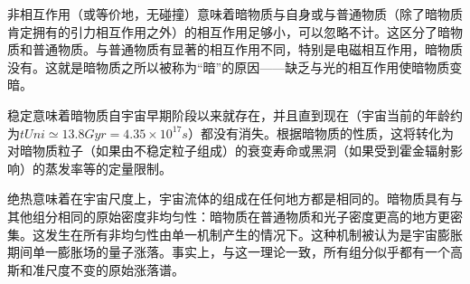 非相互作用（或等价地，无碰撞）意味着暗物质与自身或与普通物质（除了暗物质肯定拥有的引力相互作用之外）的相互作用足够小，可以忽略不计。这区分了暗物质和普通物质。与普通物质有显著的相互作用不同，特别是电磁相互作用，暗物质没有。这就是暗物质之所以被称为“暗”的原因——缺乏与光的相互作用使暗物质变暗。

稳定意味着暗物质自宇宙早期阶段以来就存在，并且直到现在（宇宙当前的年龄约为$tUni \simeq 13.8 Gyr = 4.35 \times 10^17 s$）都没有消失。根据暗物质的性质，这将转化为对暗物质粒子（如果由不稳定粒子组成）的衰变寿命或黑洞（如果受到霍金辐射影响）的蒸发率等的定量限制。

绝热意味着在宇宙尺度上，宇宙流体的组成在任何地方都是相同的。暗物质具有与其他组分相同的原始密度非均匀性：暗物质在普通物质和光子密度更高的地方更密集。这发生在所有非均匀性由单一机制产生的情况下。这种机制被认为是宇宙膨胀期间单一膨胀场的量子涨落。事实上，与这一理论一致，所有组分似乎都有一个高斯和准尺度不变的原始涨落谱。